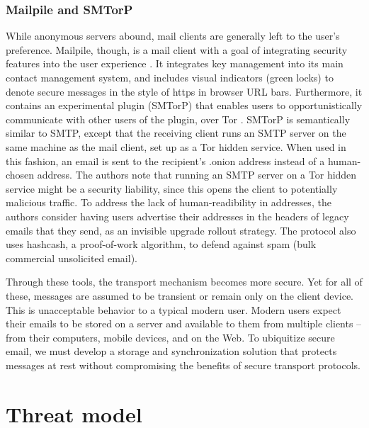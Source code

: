 \documentclass[pageno]{jpaper}
\begin{document}
\subsubsection{Mailpile and SMTorP}
While anonymous servers abound, mail clients are generally left to the user's preference. Mailpile, though, is a mail client with a goal of integrating security features into the user experience \cite{mailpile}. It integrates key management into its main contact management system, and includes visual indicators (green locks) to denote secure messages in the style of https in browser URL bars. Furthermore, it contains an experimental plugin (SMTorP) that enables users to opportunistically communicate with other users of the plugin, over Tor \cite{smtorp}. SMTorP is semantically similar to SMTP, except that the receiving client runs an SMTP server on the same machine as the mail client, set up as a Tor hidden service. When used in this fashion, an email is sent to the recipient's .onion address instead of a human-chosen address. The authors note that running an SMTP server on a Tor hidden service might be a security liability, since this opens the client to potentially malicious traffic. To address the lack of human-readibility in addresses, the authors consider having users advertise their addresses in the headers of legacy emails that they send, as an invisible upgrade rollout strategy. The protocol also uses hashcash, a proof-of-work algorithm, to defend against spam (bulk commercial unsolicited email).


Through these tools, the transport mechanism becomes more secure. Yet for all of these, messages are assumed to be transient or remain only on the client device. This is unacceptable behavior to a typical modern user. Modern users expect their emails to be stored on a server and available to them from multiple clients -- from their computers, mobile devices, and on the Web. To ubiquitize secure email, we must develop a storage and synchronization solution that protects messages at rest without compromising the benefits of secure transport protocols.


\section{Threat model}
\end{document}
